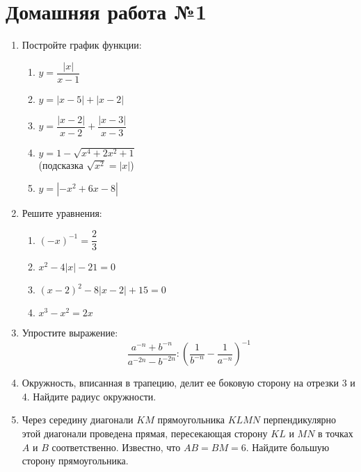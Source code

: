 \documentclass[12pt, a5paper]{article}
\begin{document}
	
	
	\section*{Домашняя работа №1}
	\begin{enumerate}
		\item Постройте график функции:
		\begin{enumerate}[label=\asbuk*)]
			\item $y=\dfrac{|x|}{x-1}$
			\item $y=|x-5|+|x-2|$
			\item $y=\dfrac{|x-2|}{x-2}+\dfrac{|x-3|}{x-3}$
			\item $y=1-\sqrt{x^4+2x^2+1}$\\
			(подсказка $\sqrt{x^2}=|x|$)
			\item $y=|-x^2+6x-8|$
		\end{enumerate}
		\item Решите уравнения:
		\begin{enumerate}[label=\asbuk*)]
			\item $(-x)^{-1}=\dfrac{2}{3}$
			\item $x^2-4|x|-21=0$
			\item $(x-2)^2-8|x-2|+15=0$
			\item $x^3-x^2=2x$
		\end{enumerate}
		\item Упростите выражение:
		$$\dfrac{a^{-n}+b^{-n}}{a^{-2n}-b^{-2n}}:\left(\dfrac{1}{b^{-n}}-\dfrac{1}{a^{-n}}\right)^{-1}$$
		\item Окружность, вписанная в трапецию, делит ее боковую сторону на отрезки 3 и 4. Найдите радиус окружности.
		\item Через середину диагонали $KM$ прямоугольника $KLMN$ перпендикулярно этой диагонали проведена прямая, пересекающая сторону $KL$ и $MN$ в точках $A$ и $B$ соответственно. Известно, что $AB=BM=6$. Найдите большую сторону прямоугольника.
	\end{enumerate}
\end{document}
